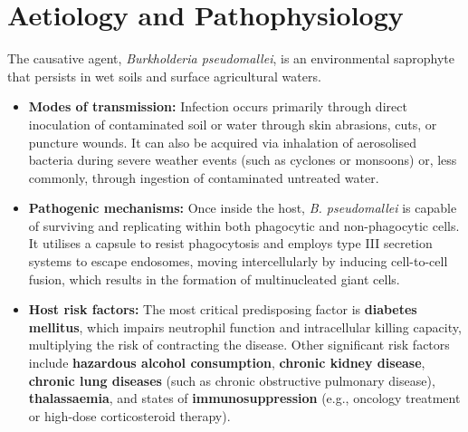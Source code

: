 \section*{Aetiology and Pathophysiology}
The causative agent, \textit{Burkholderia pseudomallei}, is an environmental saprophyte that persists in wet soils and surface agricultural waters.
\begin{itemize}
    \item \textbf{Modes of transmission:} Infection occurs primarily through direct inoculation of contaminated soil or water through skin abrasions, cuts, or puncture wounds. It can also be acquired via inhalation of aerosolised bacteria during severe weather events (such as cyclones or monsoons) or, less commonly, through ingestion of contaminated untreated water.
    \item \textbf{Pathogenic mechanisms:} Once inside the host, \textit{B. pseudomallei} is capable of surviving and replicating within both phagocytic and non-phagocytic cells. It utilises a capsule to resist phagocytosis and employs type III secretion systems to escape endosomes, moving intercellularly by inducing cell-to-cell fusion, which results in the formation of multinucleated giant cells.
    \item \textbf{Host risk factors:} The most critical predisposing factor is \textbf{diabetes mellitus}, which impairs neutrophil function and intracellular killing capacity, multiplying the risk of contracting the disease. Other significant risk factors include \textbf{hazardous alcohol consumption}, \textbf{chronic kidney disease}, \textbf{chronic lung diseases} (such as chronic obstructive pulmonary disease), \textbf{thalassaemia}, and states of \textbf{immunosuppression} (e.g., oncology treatment or high-dose corticosteroid therapy).
\end{itemize}

